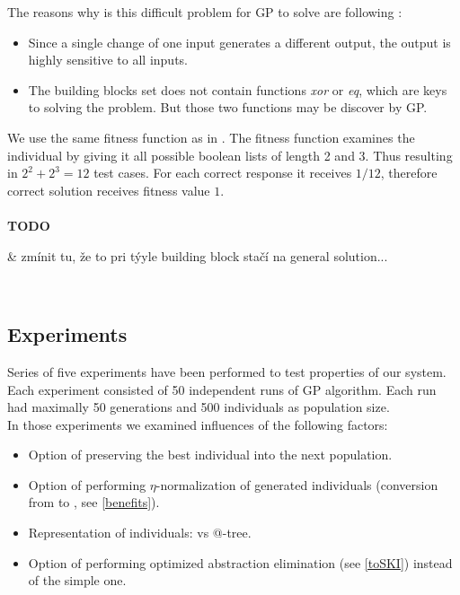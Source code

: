 \documentclass[12pt,a4paper]{report}
\makeatletter
\newcommand{\atTree}{@-tree\xspace}
\newenvironment{todo}
{ ~\\[0.5em]
  {\color{red}\textbf{TODO}}
  \begin{easylist}[itemize]}
{ \end{easylist}
  ~}
\makeatother
\begin{document}
The reasons why is this difficult problem 
for GP to solve are following \cite{todo}:

\begin{itemize}
 \item Since a single change of one input generates a different output,
       the output is highly sensitive to all inputs.
 \item The building blocks set does not contain functions \textit{xor}
       or \textit{eq}, which are keys to solving the problem.
       But those two functions may be discover by GP.  
\end{itemize}

We use the same fitness function as in \cite{yu01}. 
The fitness function examines the individual by giving
it all possible boolean lists of length 2 and 3.
Thus resulting in $2^2 + 2^3 = 12$ test cases.
For each correct response it receives $1/12$, 
therefore correct solution receives fitness value $1$.\\

\begin{todo}
 & zmínit tu, že to pri týyle building block stačí na general solution...
\end{todo}

\subsection{Experiments}

Series of five experiments have been performed to test properties of our system.
Each experiment consisted of 50 independent runs of GP algorithm.
Each run had maximally 50 generations
and 500 individuals as population size.\\
 
In those experiments we examined influences of the following factors:

\begin{itemize}
 \item Option of preserving the best individual into the next population.
 \item Option of performing $\eta$-normalization of generated individuals 
      (conversion from \lnf to \benf, see \ref{benefits}).
 \item Representation of individuals: \sexprTree vs \atTree.
 \item Option of performing optimized abstraction elimination
       (see \ref{toSKI}) instead of the simple one.
\end{itemize} 
 
\end{document}
